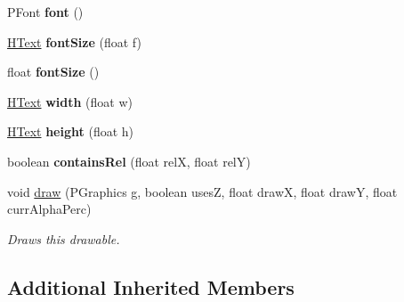 \begin{DoxyCompactItemize}
\item 
\hypertarget{classhype_1_1drawable_1_1_h_text_a273e812e78225a53012e00595543591d}{P\-Font {\bfseries font} ()}\label{classhype_1_1drawable_1_1_h_text_a273e812e78225a53012e00595543591d}

\item 
\hypertarget{classhype_1_1drawable_1_1_h_text_a8972dfdc3677f1477da78d43a65c8bc9}{\hyperlink{classhype_1_1drawable_1_1_h_text}{H\-Text} {\bfseries font\-Size} (float f)}\label{classhype_1_1drawable_1_1_h_text_a8972dfdc3677f1477da78d43a65c8bc9}

\item 
\hypertarget{classhype_1_1drawable_1_1_h_text_aa0c33b11fb4c2adb4ff564fd8647df16}{float {\bfseries font\-Size} ()}\label{classhype_1_1drawable_1_1_h_text_aa0c33b11fb4c2adb4ff564fd8647df16}

\item 
\hypertarget{classhype_1_1drawable_1_1_h_text_a34d2ed02a16e5cfde7a1234c81752405}{\hyperlink{classhype_1_1drawable_1_1_h_text}{H\-Text} {\bfseries width} (float w)}\label{classhype_1_1drawable_1_1_h_text_a34d2ed02a16e5cfde7a1234c81752405}

\item 
\hypertarget{classhype_1_1drawable_1_1_h_text_aa5de72954d2566d756b8f215fec23a1b}{\hyperlink{classhype_1_1drawable_1_1_h_text}{H\-Text} {\bfseries height} (float h)}\label{classhype_1_1drawable_1_1_h_text_aa5de72954d2566d756b8f215fec23a1b}

\item 
\hypertarget{classhype_1_1drawable_1_1_h_text_a0e58a8da08b4b63657be00cbc8a317ec}{boolean {\bfseries contains\-Rel} (float rel\-X, float rel\-Y)}\label{classhype_1_1drawable_1_1_h_text_a0e58a8da08b4b63657be00cbc8a317ec}

\item 
void \hyperlink{classhype_1_1drawable_1_1_h_text_a45d252ab33bf417402736b7f3c5476b8}{draw} (P\-Graphics g, boolean uses\-Z, float draw\-X, float draw\-Y, float curr\-Alpha\-Perc)
\begin{DoxyCompactList}\small\item\em Draws this drawable. \end{DoxyCompactList}\end{DoxyCompactItemize}
\subsection*{Additional Inherited Members}


